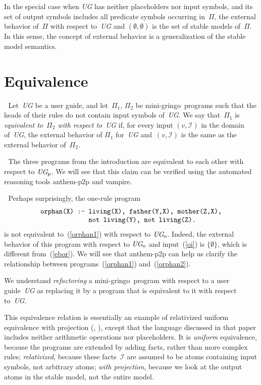 \documentclass{tlp}
\def\citeb#1{(\citeauthor{#1}, \citeyear{#1})}
\def\beq{\begin{equation}}
\def\eeq#1{\label{#1}\end{equation}}
\def\ba{\begin{array}}
\def\ea{\end{array}}
\def\gringo{{\sc gringo}}
\def\vampire{{\sc vampire}}
\newcommand{\I}{\mathcal{I}}
\begin{document}
\medskip
In the special case when \emph{UG} has neither placeholders nor input symbols,
and its set of output symbols includes all predicate symbols occurring
in~$\Pi$, the external
behavior of~$\Pi$ with respect to~\emph{UG} and $(\emptyset,\emptyset)$
is the set of stable models of~$\Pi$.  In this sense, the concept of
external behavior is a generalization of the stable model semantics.

\section{Equivalence}

$\;$
Let~\emph{UG} be a user guide, and let~$\Pi_1$, $\Pi_2$ be mini-\gringo\
programs such that the heads of their rules do not contain input symbols
of~\emph{UG}.  We say that~$\Pi_1$ is \emph{equivalent to~$\Pi_2$ with
respect to}~\emph{UG} if, for every input $(v,\I)$ in the domain of~\emph{UG},
the external behavior of $\Pi_1$ for~\emph{UG} and~$(v,\I)$ is the
same as the external behavior of~$\Pi_2$.

\medskip{}$\;$ The three programs from the
introduction are equivalent to each other with respect to $\emph{UG}_p$.
We will see that this claim can be verified using the automated reasoning
tools {\sc anthem-p2p} and \vampire.

\medskip{}$\;$ Perhaps surprisingly,
the one-rule program
\beq\ba l
\verb|orphan(X) :- living(X), father(Y,X), mother(Z,X),|\\
\verb|             not living(Y), not living(Z).|
\ea\eeq{orphan2}
is not equivalent to~(\ref{orphan1}) with respect to $\emph{UG}_o$.
Indeed, the external behavior of this program with respect
to $\emph{UG}_o$ and input~(\ref{oi}) is $\{\emptyset\}$, which
is different from~(\ref{ebor}).  We will see
that {\sc anthem-p2p} can help us clarify the relationship between
programs~(\ref{orphan1}) and~(\ref{orphan2}).

\medskip
We understand {\em refactoring} a mini-\gringo\ program with respect to a
  user guide~\emph{UG} as replacing it by a program that is equivalent
  to it with respect to~\emph{UG}.

This equivalence relation is essentially an
example of relativized uniform equivalence with projection
\citeb{oet08}, except that the language discussed in that paper includes
neither arithmetic operations nor placeholders.
It is \emph{uniform} equivalence, because the programs are extended by
adding facts, rather than more complex rules; \emph{relativized},
because these
  facts~$\I$ are assumed to be atoms containing input symbols,
  not arbitrary atoms; \emph{with projection}, because
  we look at the output atoms in the stable model, not the entire model.
\end{document}

